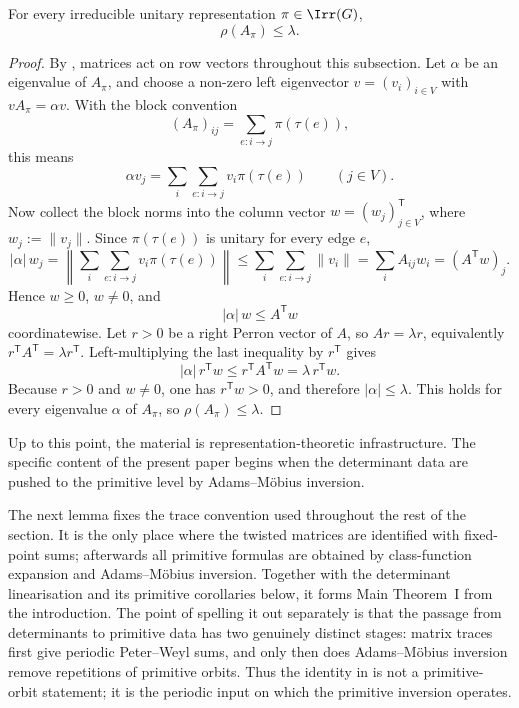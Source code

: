\begin{proposition}
  \label{prop:twisted-spectral-radius-bound}
  For every irreducible unitary representation
  \(\pi\in\Irr(G)\),
  \[
    \rho(A_\pi)\le \lambda.
  \]
\end{proposition}

\begin{proof}
  By , matrices act
  on row vectors throughout this subsection. Let \(\alpha\) be an
  eigenvalue of \(A_\pi\), and choose a non-zero left eigenvector
  \(v=(v_i)_{i\in V}\) with
  \(vA_\pi=\alpha v\). With the block convention
  \[
    (A_\pi)_{ij}=\sum_{e:i\to j}\pi(\tau(e)),
  \]
  this means
  \[
    \alpha v_j
    =
    \sum_i\sum_{e:i\to j}v_i\pi(\tau(e))
    \qquad (j\in V).
  \]
  Now collect the block norms into the column vector
  \(w=(w_j)_{j\in V}^{\mathsf T}\), where \(w_j:=\|v_j\|\). Since
  \(\pi(\tau(e))\) is unitary for every edge \(e\),
  \[
    |\alpha|\,w_j
    =
    \left\|\sum_i\sum_{e:i\to j}v_i\pi(\tau(e))\right\|
    \le \sum_i\sum_{e:i\to j}\|v_i\|
    =\sum_i A_{ij}w_i
    =(A^{\mathsf T}w)_j.
  \]
  Hence \(w\ge 0\), \(w\neq 0\), and
  \[
    |\alpha|\,w\le A^{\mathsf T}w
  \]
  coordinatewise. Let \(r>0\) be a right Perron vector of \(A\), so
  \(Ar=\lambda r\), equivalently
  \(r^{\mathsf T}A^{\mathsf T}=\lambda r^{\mathsf T}\). Left-multiplying
  the last inequality by \(r^{\mathsf T}\) gives
  \[
    |\alpha|\,r^{\mathsf T}w
    \le
    r^{\mathsf T}A^{\mathsf T}w
    =
    \lambda\,r^{\mathsf T}w.
  \]
  Because \(r>0\) and \(w\neq 0\), one has \(r^{\mathsf T}w>0\), and
  therefore \(|\alpha|\le \lambda\). This holds for every eigenvalue
  \(\alpha\) of \(A_\pi\), so \(\rho(A_\pi)\le \lambda\).
\end{proof}

\noindent
Up to this point, the material is representation-theoretic
infrastructure. The specific content of the present paper begins when
the determinant data are pushed to the primitive level by
Adams--M\"obius inversion.

The next lemma fixes the trace convention used throughout the rest of
the section. It is the only place where the twisted matrices are
identified with fixed-point sums; afterwards all primitive formulas are
obtained by class-function expansion and Adams--M\"obius inversion.
Together with the determinant linearisation and its primitive
corollaries below, it forms Main Theorem~I from the introduction.
The point of spelling it out separately is that the passage from
determinants to primitive data has two genuinely distinct stages:
matrix traces first give periodic Peter--Weyl sums, and only then does
Adams--M\"obius inversion remove repetitions of primitive orbits.
Thus the identity in  is not a
primitive-orbit statement; it is the periodic input on which the
primitive inversion operates.

